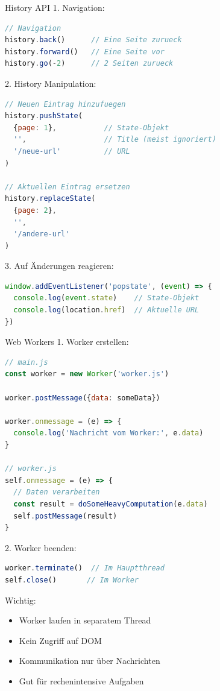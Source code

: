 \begin{KR}{History API}
1. Navigation:
\begin{lstlisting}[language=JavaScript, style=basesmol]
// Navigation
history.back()      // Eine Seite zurueck
history.forward()   // Eine Seite vor
history.go(-2)      // 2 Seiten zurueck
\end{lstlisting}

2. History Manipulation:
\begin{lstlisting}[language=JavaScript, style=basesmol]
// Neuen Eintrag hinzufuegen
history.pushState(
  {page: 1},           // State-Objekt
  '',                  // Title (meist ignoriert)
  '/neue-url'          // URL
)

// Aktuellen Eintrag ersetzen
history.replaceState(
  {page: 2},
  '',
  '/andere-url'
)
\end{lstlisting}

3. Auf Änderungen reagieren:
\begin{lstlisting}[language=JavaScript, style=basesmol]
window.addEventListener('popstate', (event) => {
  console.log(event.state)    // State-Objekt
  console.log(location.href)  // Aktuelle URL
})
\end{lstlisting}
\end{KR}

\begin{KR}{Web Workers}
1. Worker erstellen:
\begin{lstlisting}[language=JavaScript, style=basesmol]
// main.js
const worker = new Worker('worker.js')

worker.postMessage({data: someData})

worker.onmessage = (e) => {
  console.log('Nachricht vom Worker:', e.data)
}

// worker.js
self.onmessage = (e) => {
  // Daten verarbeiten
  const result = doSomeHeavyComputation(e.data)
  self.postMessage(result)
}
\end{lstlisting}

2. Worker beenden:
\begin{lstlisting}[language=JavaScript, style=basesmol]
worker.terminate()  // Im Hauptthread
self.close()       // Im Worker
\end{lstlisting}

Wichtig:
\begin{itemize}
  \item Worker laufen in separatem Thread
  \item Kein Zugriff auf DOM
  \item Kommunikation nur über Nachrichten
  \item Gut für rechenintensive Aufgaben
\end{itemize}
\end{KR}